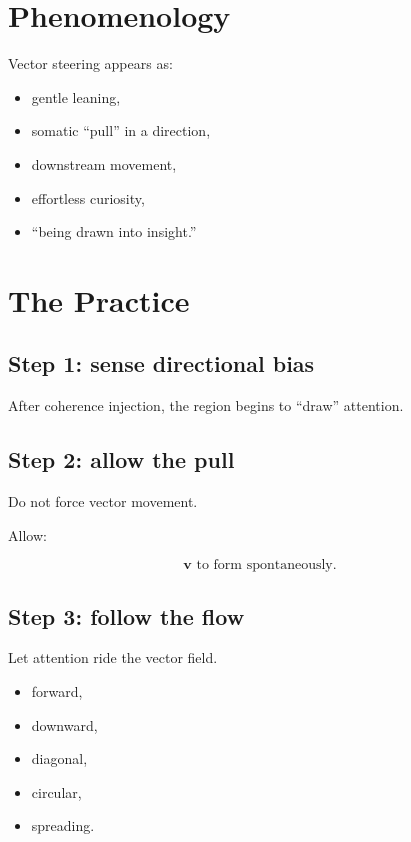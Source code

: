 \documentclass[12pt]{article}
\begin{document}
\section{Phenomenology}

Vector steering appears as:

\begin{itemize}
    \item gentle leaning,
    \item somatic ``pull'' in a direction,
    \item downstream movement,
    \item effortless curiosity,
    \item ``being drawn into insight.''
\end{itemize}

\section{The Practice}

\subsection*{Step 1: sense directional bias}

After coherence injection, the region begins to ``draw'' attention.

\subsection*{Step 2: allow the pull}

Do not force vector movement.

Allow:

\[
\mathbf{v} \text{ to form spontaneously}.
\]

\subsection*{Step 3: follow the flow}

Let attention ride the vector field.

\begin{itemize}
    \item forward,
    \item downward,
    \item diagonal,
    \item circular,
    \item spreading.
\end{itemize}
\end{document}
